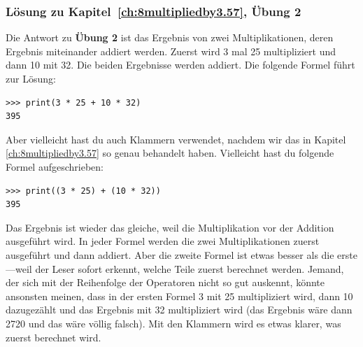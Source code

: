 \noindent
\subsubsection{Lösung zu Kapitel~\ref{ch:8multipliedby3.57}, Übung 2}
Die Antwort zu \textbf{Übung 2} ist das Ergebnis von zwei Multiplikationen, deren Ergebnis miteinander addiert werden. Zuerst wird 3 mal 25 multipliziert und dann 10 mit 32. Die beiden Ergebnisse werden addiert. Die folgende Formel führt zur Lösung:

\begin{Verbatim}[frame=single]
>>> print(3 * 25 + 10 * 32)
395
\end{Verbatim}

\noindent
Aber vielleicht hast du auch Klammern verwendet, nachdem wir das in  Kapitel \ref{ch:8multipliedby3.57} so genau behandelt haben. Vielleicht hast du folgende Formel aufgeschrieben:

\begin{Verbatim}[frame=single]
>>> print((3 * 25) + (10 * 32))
395
\end{Verbatim}

\noindent
Das Ergebnis ist wieder das gleiche, weil die Multiplikation vor der Addition ausgeführt wird. In jeder Formel werden die zwei Multiplikationen zuerst ausgeführt und dann addiert. Aber die zweite Formel ist etwas besser als die erste---weil der Leser sofort erkennt, welche Teile zuerst berechnet werden. Jemand, der sich mit der Reihenfolge der Operatoren nicht so gut auskennt, könnte ansonsten meinen, dass in der ersten Formel 3 mit 25 multipliziert wird, dann 10 dazugezählt und das Ergebnis mit 32 multipliziert wird (das Ergebnis wäre dann 2720 und das wäre völlig falsch). Mit den Klammern wird es etwas klarer, was zuerst berechnet wird.

